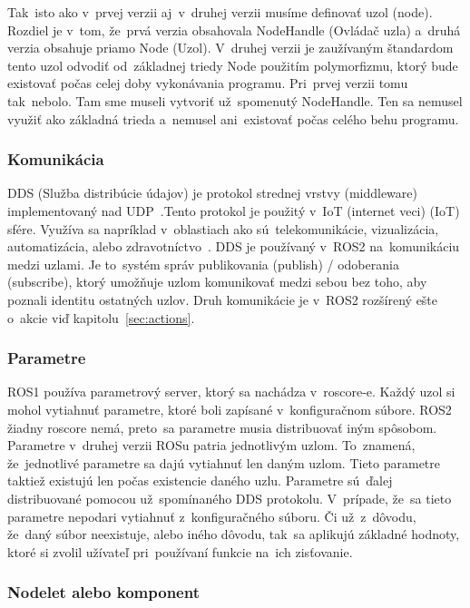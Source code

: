 	Tak~isto ako v~prvej verzii aj~v~druhej verzii musíme definovať uzol (node). Rozdiel je v~tom, že~prvá verzia obsahovala NodeHandle (Ovládač uzla)
	a~druhá verzia obsahuje priamo Node (Uzol). V~druhej verzii je zaužívaným štandardom tento uzol odvodiť od~základnej
	triedy Node použitím polymorfizmu, ktorý bude existovať počas celej doby vykonávania programu. Pri~prvej verzii tomu
	tak~nebolo. Tam sme museli vytvoriť už~spomenutý NodeHandle. Ten sa nemusel využiť ako základná trieda a~nemusel
	ani~existovať počas celého behu programu.

\subsubsection{Komunikácia}

	DDS (Služba distribúcie údajov) je protokol strednej vrstvy (middleware) implementovaný nad
	UDP~\cite{ROS2book}.Tento protokol je použitý v~IoT (internet veci) (\acrlong{IoT}) sfére.
	Využíva sa napríklad v~oblastiach ako sú~telekomunikácie, vizualizácia, automatizácia, alebo
	zdravotníctvo~\cite{siteTrend}. DDS je používaný v~ROS2 na~komunikáciu medzi uzlami.
	Je to~systém správ publikovania (publish) / odoberania (subscribe), ktorý umožňuje uzlom
	komunikovať medzi sebou bez toho, aby poznali identitu ostatných uzlov. Druh komunikácie
	je v~ROS2 rozšírený ešte o~akcie viď kapitolu~\ref{sec:actions}.

\subsubsection{Parametre}

	ROS1 používa parametrový server, ktorý sa nachádza v~roscore-e. Každý uzol si mohol vytiahnuť parametre, ktoré boli zapísané v~konfiguračnom
	súbore. ROS2 žiadny roscore nemá, preto~sa parametre musia distribuovať iným spôsobom. Parametre v~druhej verzii ROSu patria jednotlivým uzlom.
	To~znamená, že~jednotlivé parametre sa dajú vytiahnuť len daným uzlom. Tieto parametre taktiež existujú len počas existencie daného uzlu. Parametre
	sú~ďalej distribuované pomocou už~spomínaného DDS protokolu. V~prípade, že~sa tieto parametre nepodari vytiahnuť z~konfiguračného súboru. Či už~z~dôvodu,
	že~daný súbor neexistuje, alebo iného dôvodu, tak~sa aplikujú základné hodnoty, ktoré si zvolil užívateľ pri~používaní funkcie na~ich zisťovanie.

\subsubsection{Nodelet alebo komponent}

